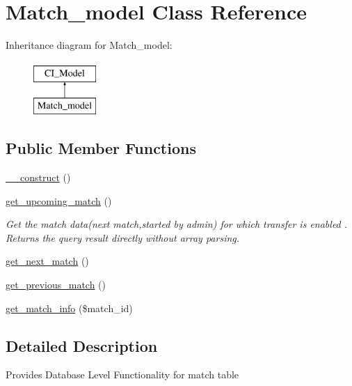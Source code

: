 \hypertarget{class_match__model}{}\section{Match\+\_\+model Class Reference}
\label{class_match__model}
Inheritance diagram for Match\+\_\+model\+:\begin{figure}[H]
\begin{center}
\leavevmode
\includegraphics[height=2.000000cm]{class_match__model}
\end{center}
\end{figure}
\subsection*{Public Member Functions}
\begin{DoxyCompactItemize}
\item 
\hyperlink{class_match__model_a095c5d389db211932136b53f25f39685}{\+\_\+\+\_\+construct} ()
\item 
\hyperlink{class_match__model_a6fad7c3f5680dc3402cac6c6419a8774}{get\+\_\+upcoming\+\_\+match} ()
\begin{DoxyCompactList}\small\item\em Get the match data(next match,started by admin) for which transfer is enabled . Returns the query result directly without array parsing. \end{DoxyCompactList}\item 
\hyperlink{class_match__model_a6cd5813f94cc478d2da57e7a1b5b05ea}{get\+\_\+next\+\_\+match} ()
\item 
\hyperlink{class_match__model_ae9e4f853c3a51ded8eb00303a09023af}{get\+\_\+previous\+\_\+match} ()
\item 
\hyperlink{class_match__model_a0a059fea5654ff79dbd2aa1cc038e5e1}{get\+\_\+match\+\_\+info} (\$match\+\_\+id)
\end{DoxyCompactItemize}


\subsection{Detailed Description}
Provides Database Level Functionality for {\ttfamily match} table 

